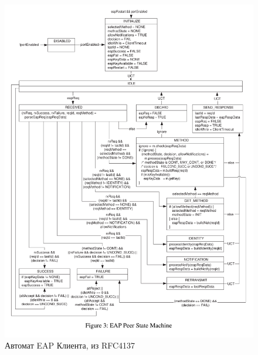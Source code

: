 \documentclass{extarticle}
\begin{document}
\begin{figure}
  \centering \includegraphics{res/eap-peer-state-machine-rfc4137.png}
  \caption{Автомат EAP Клиента, из RFC4137}
\end{figure}
\end{document}
